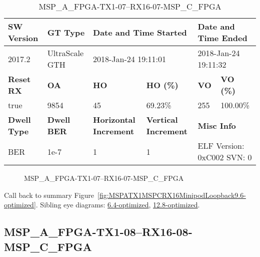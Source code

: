 \begin{table}[h]
\centering
\caption{MSP\_A\_FPGA-TX1-07--RX16-07-MSP\_C\_FPGA}
\label{tab:MSPAFPGATX107RX1607MSPCFPGA9.6-optimized}
\begin{tabular}{@{}|l|l|l|l|l|l|@{}}
\toprule
\textbf{SW Version}                & \textbf{GT Type}   & \multicolumn{2}{l|}{\textbf{Date and Time Started}}            & \multicolumn{2}{l|}{\textbf{Date and Time Ended}}        \\ \midrule
2017.2                       & UltraScale GTH          & \multicolumn{2}{l|}{2018-Jan-24 19:11:01}                   & \multicolumn{2}{l|}{2018-Jan-24 19:11:32}               \\ \midrule
\textbf{Reset RX}                  & \textbf{OA} & \textbf{HO}   & \textbf{HO (\%)} & \textbf{VO} & \textbf{VO (\%)} \\ \midrule
true & 9854        & 45          & 69.23\%        & 255        & 100.00\%       \\ \midrule
\textbf{Dwell Type}                & \textbf{Dwell BER} & \textbf{Horizontal Increment} & \textbf{Vertical Increment}    & \multicolumn{2}{l|}{\textbf{Misc Info}}                  \\ \midrule
BER                            & 1e-7        & 1        & 1           & \multicolumn{2}{l|}{ELF Version: 0xC002 SVN: 0}                         \\ \bottomrule
\end{tabular}
\end{table}

\begin{figure}[h]
\caption{MSP\_A\_FPGA-TX1-07--RX16-07-MSP\_C\_FPGA} \label{fig:MSPAFPGATX107RX1607MSPCFPGA9.6-optimized}
\end{figure}

Call back to summary Figure~\ref{fig:MSPATX1MSPCRX16MinipodLoopback9.6-optimized}.
Sibling eye diagrams: \hyperref[sec:MSPAFPGATX107RX1607MSPCFPGA6.4-optimized]{6.4-optimized}, \hyperref[sec:MSPAFPGATX107RX1607MSPCFPGA12.8-optimized]{12.8-optimized}.

\clearpage
\newpage


\subsection{MSP\_A\_FPGA-TX1-08--RX16-08-MSP\_C\_FPGA}\label{sec:MSPAFPGATX108RX1608MSPCFPGA9.6-optimized}


